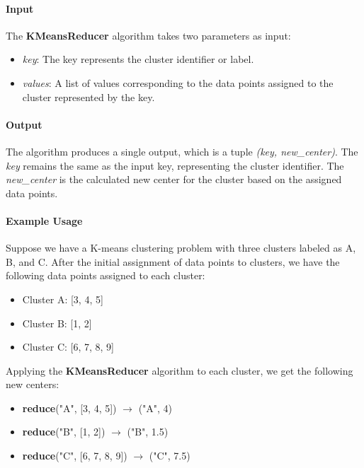\documentclass[parskip=full]{report}
\begin{document}
\paragraph{Input}

The \textbf{KMeansReducer} algorithm takes two parameters as input:
\begin{itemize}
	\item \textit{key}: The key represents the cluster identifier or label.
	\item \textit{values}: A list of values corresponding to the data points assigned to the cluster represented by the key.
\end{itemize}

\paragraph{Output}

The algorithm produces a single output, which is a tuple \textit{(key, new\_center)}. The \textit{key} remains the same as the input key, representing the cluster identifier. The \textit{new\_center} is the calculated new center for the cluster based on the assigned data points.

\paragraph{Example Usage}

Suppose we have a K-means clustering problem with three clusters labeled as A, B, and C. After the initial assignment of data points to clusters, we have the following data points assigned to each cluster:

\begin{itemize}
	\item Cluster A: [3, 4, 5]
	\item Cluster B: [1, 2]
	\item Cluster C: [6, 7, 8, 9]
\end{itemize}

Applying the \textbf{KMeansReducer} algorithm to each cluster, we get the following new centers:

\begin{itemize}
	\item \textbf{reduce}("A", [3, 4, 5]) $\rightarrow$ ("A", 4)
	\item \textbf{reduce}("B", [1, 2]) $\rightarrow$ ("B", 1.5)
	\item \textbf{reduce}("C", [6, 7, 8, 9]) $\rightarrow$ ("C", 7.5)
\end{itemize}
\end{document}
